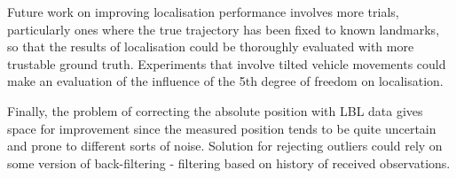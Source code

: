 Future work on improving localisation performance involves more trials, particularly ones where the true trajectory has been fixed to known landmarks, so that the results of localisation could be thoroughly evaluated with more trustable ground truth. Experiments that involve tilted vehicle movements could make an evaluation of the influence of the 5th degree of freedom on localisation. 

Finally, the problem of correcting the absolute position with LBL data gives space for improvement since the measured position tends to be quite uncertain and prone to different sorts of noise. Solution for rejecting outliers could rely on some version of back-filtering - filtering based on history of received observations.          